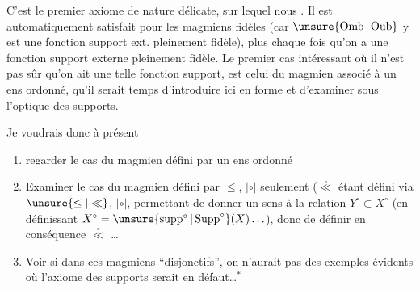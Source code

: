 \clearpage
{}

C'est le premier axiome de nature délicate, sur lequel nous . Il est automatiquement satisfait pour les magmiens fidèles (car $\unsure{\operatorname{Omb}|\operatorname{Oub}}$ y est une fonction support ext. pleinement fidèle), plus  chaque fois qu'on a une fonction support externe pleinement fidèle. Le premier cas intéressant où il n'est pas sûr qu'on ait une telle fonction support, est celui du magmien associé à un ens ordonné, qu'il serait temps d'introduire ici en forme et d'examiner sous l'optique des supports.

Je voudrais donc à présent
\begin{enumerate}[label=\arabic*\textsuperscript{o}),leftmargin=*]
\item regarder le cas du magmien  défini par un ens ordonné
\item Examiner le cas du magmien défini par $\leq$, $|\circ|$ seulement ($\overset{\circ}{\ll}$ étant défini via $\unsure{\leq|\ll}$, $|\circ|$,   permettant de donner un sens à la relation $Y^{\circ}\subset X^{\circ}$ (en définissant $X^{\circ}=\unsure{\operatorname{supp}^{\circ}|\operatorname{Supp}^{\circ}}(X)\ldots$), donc de définir en conséquence $\overset{\circ}{\ll}$ \ldots
\item Voir si dans ces magmiens ``disjonctifs'', on n'aurait pas des exemples évidents où l'axiome des supports serait en défaut\ldots$^*$
\end{enumerate}
